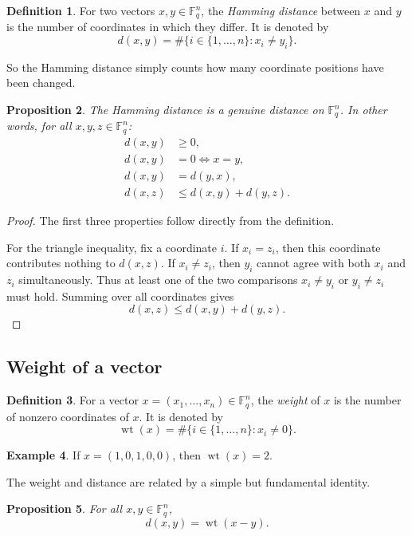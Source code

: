 \documentclass[11pt]{article}
\newtheorem{proposition}{Proposition}[section]
\theoremstyle{definition}
\newtheorem{definition}[proposition]{Definition}
\newtheorem{example}[proposition]{Example}
\theoremstyle{remark}
\newcommand{\F}{\mathbb{F}}
\newcommand{\wt}{\operatorname{wt}}
\begin{document}
\begin{definition}
For two vectors $x,y\in\F_q^n$, the \emph{Hamming distance} between $x$ and $y$ is the number of coordinates in which they differ. It is denoted by
\[
d(x,y)=\#\{i\in\{1,\dots,n\}: x_i\neq y_i\}.
\]
\end{definition}

So the Hamming distance simply counts how many coordinate positions have been changed.

\begin{proposition}
The Hamming distance is a genuine distance on $\F_q^n$. In other words, for all $x,y,z\in\F_q^n$:
\begin{align*}
d(x,y)&\ge 0,\\
d(x,y)&=0 \iff x=y,\\
d(x,y)&=d(y,x),\\
d(x,z)&\le d(x,y)+d(y,z).
\end{align*}
\end{proposition}

\begin{proof}
The first three properties follow directly from the definition.

For the triangle inequality, fix a coordinate $i$. If $x_i=z_i$, then this coordinate contributes nothing to $d(x,z)$. If $x_i\neq z_i$, then $y_i$ cannot agree with both $x_i$ and $z_i$ simultaneously. Thus at least one of the two comparisons $x_i\neq y_i$ or $y_i\neq z_i$ must hold. Summing over all coordinates gives
\[
d(x,z)\le d(x,y)+d(y,z).
\]
\end{proof}

\subsection{Weight of a vector}

\begin{definition}
For a vector $x=(x_1,\dots,x_n)\in\F_q^n$, the \emph{weight} of $x$ is the number of nonzero coordinates of $x$. It is denoted by
\[
\wt(x)=\#\{i\in\{1,\dots,n\}: x_i\neq 0\}.
\]
\end{definition}

\begin{example}
If $x=(1,0,1,0,0)$, then $\wt(x)=2$.
\end{example}

The weight and distance are related by a simple but fundamental identity.

\begin{proposition}
For all $x,y\in\F_q^n$,
\[
d(x,y)=\wt(x-y).
\]
\end{proposition}
\end{document}

